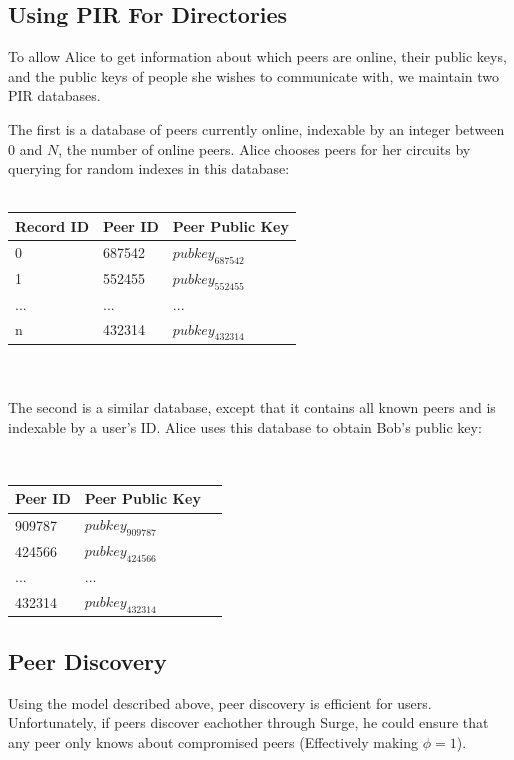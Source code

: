\documentclass[twocolumn,11pt,english]{article}
\begin{document}
\subsection{Using PIR For Directories}
To allow Alice to get information about which peers are online, their public keys, and the public keys of people she wishes to communicate with, we maintain two PIR databases.

The first is a database of peers currently online, indexable by an integer between 0 and $N$, the number of online peers. Alice chooses peers for her circuits by querying for random indexes in this database:
\\ \hfill\\ 
\begin{tabular}{| l | l | l |}
  \hline
  Record ID & Peer ID & Peer Public Key \\ \hline
  0 & 687542 & $pubkey_{687542}$  \\ \hline
  1 & 552455 & $pubkey_{552455}$  \\ \hline
  ... & ... & $...$  \\ \hline
  n & 432314 & $pubkey_{432314}$  \\ \hline
\end{tabular}

\hfill\\\hfill\\The second is a similar database, except that it contains all known peers and is indexable by a user's ID. Alice uses this database to obtain Bob's public key:

\hfill\\ 
\begin{tabular}{| l | l | l |}
  \hline
  Peer ID & Peer Public Key \\ \hline
  909787 & $pubkey_{909787}$  \\ \hline
  424566 & $pubkey_{424566}$  \\ \hline
  ... & $...$  \\ \hline
  432314 & $pubkey_{432314}$  \\ \hline
\end{tabular}


\subsection{Peer Discovery}
Using the model described above, peer discovery is efficient for users.  Unfortunately, if peers discover eachother through Surge, he could ensure that any peer only knows about compromised peers (Effectively making $\phi = 1$).
\end{document}

